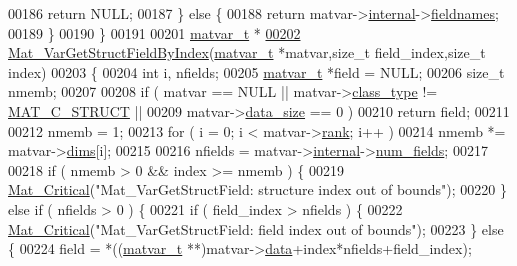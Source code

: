 \begin{DoxyCode}
00186         \textcolor{keywordflow}{return} NULL;
00187     \} \textcolor{keywordflow}{else} \{
00188         \textcolor{keywordflow}{return} matvar->\hyperlink{group___m_a_t_a6e97e3ed9f40c49322c18561c2a94e92}{internal}->\hyperlink{structmatvar__internal_a7574d000bfc98ad4860ae6590b8d4985}{fieldnames};
00189     \}
00190 \}
00191 
00201 \hyperlink{group___m_a_t_structmatvar__t}{matvar\_t} *
\hyperlink{group___m_a_t_ga03ab2d89f683f9ccb4785fb255b14e0b}{00202} \hyperlink{group___m_a_t_ga03ab2d89f683f9ccb4785fb255b14e0b}{Mat\_VarGetStructFieldByIndex}(\hyperlink{group___m_a_t_structmatvar__t}{matvar\_t} *matvar,\textcolor{keywordtype}{size\_t} field\_index,\textcolor{keywordtype}{size\_t}
       index)
00203 \{
00204     \textcolor{keywordtype}{int}       i, nfields;
00205     \hyperlink{group___m_a_t_structmatvar__t}{matvar\_t} *field = NULL;
00206     \textcolor{keywordtype}{size\_t} nmemb;
00207 
00208     \textcolor{keywordflow}{if} ( matvar == NULL || matvar->\hyperlink{group___m_a_t_aff13035bf3265dd7d9425e5d40c839d4}{class\_type} != \hyperlink{group___m_a_t_ggad4d60ae7b709fc81bfd744fb4c857c40acb467c7749c80902b798134c729bb521}{MAT\_C\_STRUCT}   ||
00209         matvar->\hyperlink{group___m_a_t_a9ad1c82e2b568da617e12dc73a26e1f9}{data\_size} == 0 )
00210         \textcolor{keywordflow}{return} field;
00211 
00212     nmemb = 1;
00213     \textcolor{keywordflow}{for} ( i = 0; i < matvar->\hyperlink{group___m_a_t_a84ba70c96ded13cc555fa75b768d9921}{rank}; i++ )
00214         nmemb *= matvar->\hyperlink{group___m_a_t_a8e01234e1c862ce3472bb37f5a09b92c}{dims}[i];
00215 
00216     nfields = matvar->\hyperlink{group___m_a_t_a6e97e3ed9f40c49322c18561c2a94e92}{internal}->\hyperlink{structmatvar__internal_a93fc447484f455eddf9334f2e9e411c2}{num\_fields};
00217 
00218     if ( nmemb > 0 && index >= nmemb ) \{
00219         \hyperlink{group__mat__util_gaf51f2bfbb5580f575e4dd79757e2b80c}{Mat\_Critical}(\textcolor{stringliteral}{"Mat\_VarGetStructField: structure index out of bounds"});
00220     \} \textcolor{keywordflow}{else} \textcolor{keywordflow}{if} ( nfields > 0 ) \{
00221         \textcolor{keywordflow}{if} ( field\_index > nfields ) \{
00222             \hyperlink{group__mat__util_gaf51f2bfbb5580f575e4dd79757e2b80c}{Mat\_Critical}(\textcolor{stringliteral}{"Mat\_VarGetStructField: field index out of bounds"});
00223         \} \textcolor{keywordflow}{else} \{
00224             field = *((\hyperlink{group___m_a_t_structmatvar__t}{matvar\_t} **)matvar->\hyperlink{group___m_a_t_a5672978efa230bbdecdf38ede781f7fa}{data}+index*nfields+field\_index);

\end{DoxyCode}
